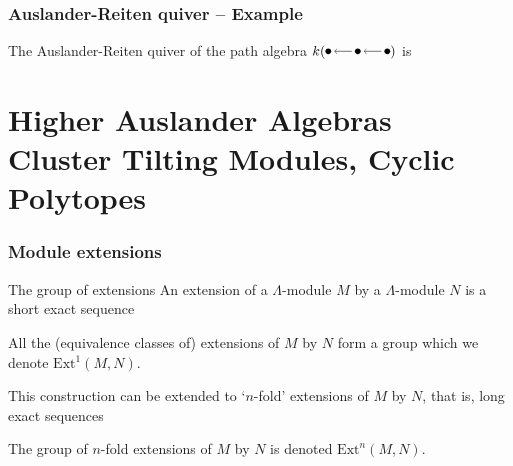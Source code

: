 \begin{frame}
 \frametitle{Auslander-Reiten quiver -- Example}
 The Auslander-Reiten quiver of the path algebra $k(\tikz[baseline=-3pt]{
 	\node[circle,fill,inner sep=1.5pt] (a) at (0,0) {};
 	\node[circle,fill,inner sep=1.5pt] (b) at (0.75,0) {};
 	\node[circle,fill,inner sep=1.5pt] (c) at (1.5,0) {};

 	\draw[<-,shorten <=2pt, shorten >=2pt] (a) -- (b);
 	\draw[<-,shorten <=2pt, shorten >=2pt] (b) -- (c);
 })$ is
 \begin{figure}[h]
  \centering
 \end{figure}
\end{frame}

\section{Higher Auslander Algebras \\ \normalsize
\textcolor{black!60!bgcolorAlt}{Cluster Tilting Modules, Cyclic Polytopes}}

\begin{frame}[fragile]
 \frametitle{Module extensions}
 \begin{alertblock}{The group of extensions}
 	An \alert{extension} of a $\Lambda$-module $M$ by a $\Lambda$-module $N$ is a
 	\alert{short exact sequence}
 	\begin{figure}[h]
 	 \centering
 	\end{figure}
 	All the (equivalence classes of) extensions of $M$ by $N$ form a group which
 	we denote $\mathrm{Ext^{1}}(M,N)$.
 \end{alertblock}
 \pause
 This construction can be extended to `$n$-fold' extensions of $M$ by $N$, that
 is, \alert{long exact sequences}
 \begin{figure}[h]
  \centering
 \end{figure}
 The group of $n$-fold extensions of $M$ by $N$ is denoted
 $\mathrm{Ext}^{n}(M,N)$.
\end{frame}

